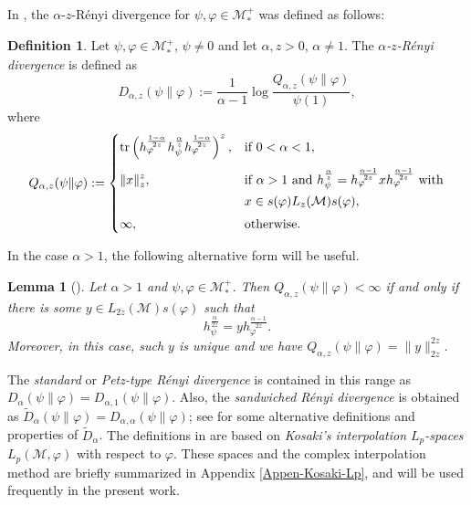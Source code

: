 \documentclass[12pt]{article}
\newtheorem{lemma}[theorem]{Lemma}
\theoremstyle{definition}
\newtheorem{defi}[theorem]{Definition}
\theoremstyle{remark}
\numberwithin{equation}{section}
\def\Me{\mathcal M}
\def\Tr{\mathrm{tr}}
\begin{document}

In \cite{kato2023aremark, kato2023onrenyi}, the
$\alpha$-$z$-R\'enyi divergence for $\psi,\varphi\in \mathcal M_*^+$  was defined as follows:

\begin{defi}\label{defi:renyi} Let $\psi,\varphi\in \Me_*^+$, $\psi\ne 0$ and let
$\alpha,z>0$, $\alpha\ne 1$. The \emph{$\alpha$-$z$-R\'enyi divergence} is defined as 
\[
D_{\alpha,z}(\psi\|\varphi):=\frac1{\alpha-1}\log
\frac{Q_{\alpha,z}(\psi\|\varphi)}{\psi(1)},
\]
where
\[
Q_{\alpha,z}(\psi\|\varphi):=\begin{dcases} \Tr
\left(h_\varphi^{\frac{1-\alpha}{2z}}h_\psi^{\frac{\alpha}{z}}h_\varphi^{\frac{1-\alpha}{2z}}\right)^z, &
\text{if } 0<\alpha<1,\\[0.3em]
\|x\|_z^z, & \text{if } \alpha>1 \text{ and }
h_\psi^{\frac{\alpha}{z}}=h_\varphi^{\frac{\alpha-1}{2z}}xh_\varphi^{\frac{\alpha-1}{2z}}
\ \text{with}\\ & x\in s(\varphi)L_z(\Me)s(\varphi),\\[0.3em]
\infty,& \text{otherwise}.
\end{dcases}
\]
\end{defi}


In the case $\alpha>1$, the following alternative form will be useful.

\begin{lemma}[\mbox{\cite[Lemma 7]{kato2023onrenyi}}]\label{lemma:renyi_2z}
Let $\alpha>1$ and $\psi,\varphi\in \Me_*^+$. Then $Q_{\alpha,z}(\psi\|\varphi)<\infty$ if
and only if there is some $y\in L_{2z}(\Me)s(\varphi)$ such that 
\[
h_\psi^{\frac{\alpha}{2z}}=yh_\varphi^{\frac{\alpha-1}{2z}}.
\]
Moreover, in this case, such $y$ is unique and we have
$Q_{\alpha,z}(\psi\|\varphi)=\|y\|_{2z}^{2z}$. 
\end{lemma}

The \emph{standard} or \emph{Petz-type R\'enyi divergence}
\cite{petz1985quasi,hiai2018quantum,hiai2021quantum} is contained in this range as
$D_\alpha(\psi\|\varphi)=D_{\alpha,1}(\psi\|\varphi)$. Also, the \emph{sandwiched R\'enyi divergence} is
obtained as $\tilde D_\alpha(\psi\|\varphi)=D_{\alpha,\alpha}(\psi\|\varphi)$; see
\cite{berta2018renyi,hiai2021quantum,jencova2018renyi, jencova2021renyi} for some
alternative definitions and properties of $\tilde D_\alpha$. {The definitions in
\cite{jencova2018renyi,jencova2021renyi} are based on \emph{Kosaki's interpolation $L_p$-spaces}
$L_p(\Me,\varphi)$ \cite{kosaki1984applications} with respect to $\varphi$. These spaces and the
complex interpolation method are briefly summarized in Appendix \ref{Appen-Kosaki-Lp}, and will be used
frequently in the present work.}
\end{document}
